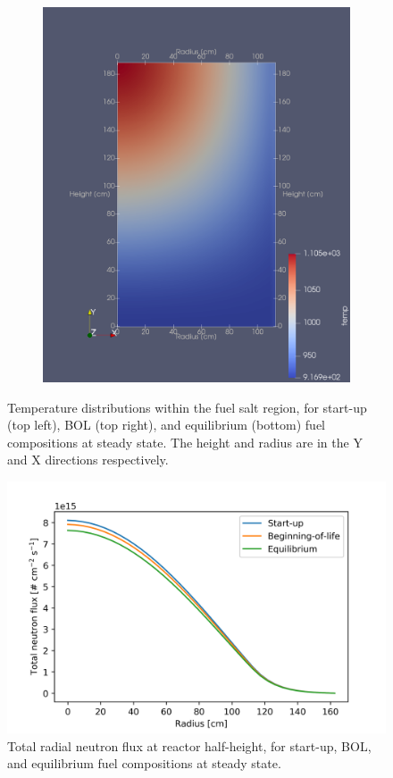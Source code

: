 \documentclass{anstrans}
\begin{document}
\begin{figure}
\begin{subfigure}{1\columnwidth}
\end{subfigure}\hfill\\
\bigskip
\centering
\begin{subfigure}{1\columnwidth}
\includegraphics[width=\columnwidth]{./figures/eqtemp}%
\label{subfigc}%
\end{subfigure}%
\captionsetup{justification=centering}
\caption{Temperature distributions within the fuel salt region, for start-up
(top left), \gls{BOL} (top right), and equilibrium (bottom) fuel compositions
at steady state. The height and radius are in the Y and X directions
respectively.}
\label{fig:temp}
\end{figure}
%
\begin{figure}[H] 
	\centering
	\includegraphics[width=.53\textwidth]{./figures/totalflux}
	\captionsetup{justification=centering}
	\caption{Total radial neutron flux at reactor half-height, for start-up,
	\gls{BOL}, and equilibrium fuel compositions at steady state.}
	\label{fig:totalflux}
\end{figure} 
\end{document}

